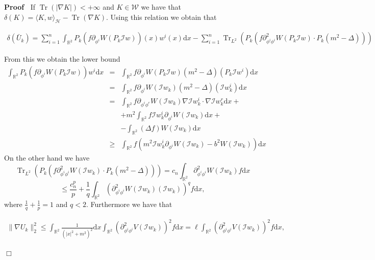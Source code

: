 \documentclass[a4paper,10pt]{article}
\newcommand{\mathd}{\mathrm{d}}
\newcommand{\tmop}[1]{\ensuremath{\operatorname{#1}}}
\newenvironment{proof}{\noindent\textbf{Proof\ }}{\hspace*{\fill}$\Box$\medskip}
\begin{document}
\begin{proof}
  If $\tmop{Tr} (| \nabla K |) < + \infty$ and $K \in \mathcal{W}$ we have
  that $\delta (K) = \langle K, w \rangle_{\mathcal{H}} - \tmop{Tr} (\nabla
  K)$. Using this relation we obtain that
  
  \begin{multline*}
    \delta (\bar{U}_k) = \sum_{i = 1}^n \int_{\mathbb{R}^2} P_k (f
    \partial_{\phi^i} W (P_k \mathcal{I}w)) (x) w^i (x) \mathd x - \sum_{i = 1}^n \tmop{Tr}_{L^2} (P_k (f \partial_{\phi^i \phi^i}^2 W (P_k
    \mathcal{I}w) \cdot P_k (m^2 - \Delta)))
  \end{multline*}
  
  From this we obtain the lower bound
  \begin{eqnarray}
    \int_{\mathbb{R}^2} P_k (f \partial_{\phi^i} W (P_k \mathcal{I}w)) w^i
    \mathd x & = & \int_{\mathbb{R}^2} f \partial_{\phi^i} W (P_k
    \mathcal{I}w) (m^2 - \Delta) (P_k \mathcal{I}w^i) \mathd x \nonumber\\
    & = & \int_{\mathbb{R}^2} f \partial_{\phi^i} W (\mathcal{I}w_k) (m^2 -
    \Delta) (\mathcal{I}w_k^i) \mathd x \nonumber\\
    & = & \int_{\mathbb{R}^2} f \partial_{\phi^i \phi^r} W (\mathcal{I}w_k)
    \nabla \mathcal{I}w^i_k \cdot \nabla \mathcal{I}w^r_k \mathd x +
    \nonumber\\
    &  & + m^2 \int_{\mathbb{R}^2} f\mathcal{I}w^i_k \partial_{\phi^i} W
    (\mathcal{I}w_k) \mathd x + \nonumber\\
    &  & - \int_{\mathbb{R}^2} (\Delta f) W (\mathcal{I}w_k) \mathd x
    \nonumber\\
    & \geqslant & \int_{\mathbb{R}^2} f (m^2 \mathcal{I}w^i_k
    \partial_{\phi^i} W (\mathcal{I}w_k) - b^2 W (\mathcal{I}w_k)) \mathd x
    \nonumber
  \end{eqnarray}
  On the other hand we have
  \[ \tmop{Tr}_{L^2} (P_k (f \partial_{\phi^i \phi^i}^2 W (\mathcal{I}w_k)
     \cdot P_k (m^2 - \Delta))) = c_n \int_{\mathbb{R}^2} \partial_{\phi^i
     \phi^i}^2 W (\mathcal{I}w_k) f \mathd x \]
  \[ \leqslant \frac{c_n^p}{p} + \frac{1}{q} \int_{\mathbb{R}^2}
     (\partial_{\phi^i \phi^i}^2 W (\mathcal{I}w_k) (\mathcal{I}w_k))^q f
     \mathd x, \]
  where $\frac{1}{q} + \frac{1}{p} = 1$ and $q < 2$. Furthermore we have that
  
  \begin{multline*}
    \| \nabla U_k \|^2_2 \leqslant \int_{\mathbb{R}^2} \frac{1}{(| x |^2 +
    m^2)^2} \mathd x \int_{\mathbb{R}^2} (\partial_{\phi^i \phi^i}^2 V
    (\mathcal{I}w_k))^2 f \mathd x = \ell \int_{\mathbb{R}^2} (\partial_{\phi^i \phi^i}^2 V
    (\mathcal{I}w_k))^2 f \mathd x,
  \end{multline*}
  

\end{proof}
\end{document}
